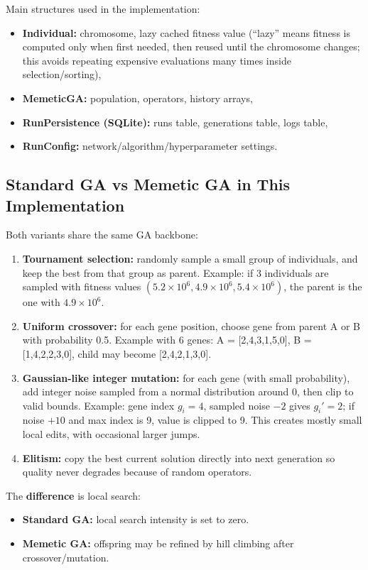 \documentclass[12pt, a4paper]{article}
\begin{document}
Main structures used in the implementation:
\begin{itemize}
	\item \textbf{Individual:} chromosome, lazy cached fitness value (``lazy'' means fitness is computed only when first needed, then reused until the chromosome changes; this avoids repeating expensive evaluations many times inside selection/sorting),
	\item \textbf{MemeticGA:} population, operators, history arrays,
	\item \textbf{RunPersistence (SQLite):} runs table, generations table, logs table,
	\item \textbf{RunConfig:} network/algorithm/hyperparameter settings.
\end{itemize}

\subsection{Standard GA vs Memetic GA in This Implementation}

Both variants share the same GA backbone:
\begin{enumerate}
	\item \textbf{Tournament selection:} randomly sample a small group of individuals, and keep the best from that group as parent. Example: if 3 individuals are sampled with fitness values $(5.2\times10^6, 4.9\times10^6, 5.4\times10^6)$, the parent is the one with $4.9\times10^6$.
	\item \textbf{Uniform crossover:} for each gene position, choose gene from parent A or B with probability 0.5. Example with 6 genes: A = [2,4,3,1,5,0], B = [1,4,2,2,3,0], child may become [2,4,2,1,3,0].
	\item \textbf{Gaussian-like integer mutation:} for each gene (with small probability), add integer noise sampled from a normal distribution around 0, then clip to valid bounds. Example: gene index $g_i=4$, sampled noise $-2$ gives $g_i'=2$; if noise $+10$ and max index is 9, value is clipped to 9. This creates mostly small local edits, with occasional larger jumps.
	\item \textbf{Elitism:} copy the best current solution directly into next generation so quality never degrades because of random operators.
\end{enumerate}

The \textbf{difference} is local search:
\begin{itemize}
	\item \textbf{Standard GA:} local search intensity is set to zero.
	\item \textbf{Memetic GA:} offspring may be refined by hill climbing after crossover/mutation.
\end{itemize}
\end{document}
